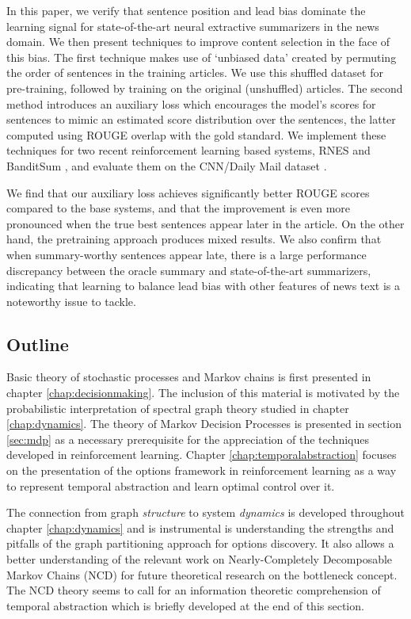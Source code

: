 In this paper, we verify that 
sentence position and lead bias dominate the 
learning signal for  state-of-the-art neural 
extractive summarizers in the news domain. 
We then present techniques to improve content selection in 
the face of this bias. 
The first technique makes use of `unbiased data' 
created by permuting the order of sentences in the training
articles. We use this shuffled dataset for pre-training, followed by 
training on the original (unshuffled) articles. 
The second method introduces an auxiliary loss 
which encourages the model's scores for sentences 
to mimic an estimated score distribution over the
sentences, the latter computed using ROUGE overlap 
with the gold standard. We implement these techniques 
for two recent reinforcement learning based systems, 
RNES \parencite{DBLP:conf/aaai/WuH18} and 
BanditSum \parencite{dong2018banditsum}, and evaluate 
them on the CNN/Daily Mail dataset \parencite{hermann2015teaching}.

We find that our auxiliary loss achieves 
significantly better ROUGE scores
compared to the base systems, and that the 
improvement is even more pronounced when the true 
best sentences appear later in the article. 
On the other hand, the pretraining approach produces mixed results.
We also confirm that when summary-worthy sentences 
appear late, there is a large performance discrepancy 
between the oracle summary and state-of-the-art summarizers,
indicating that learning to balance lead bias with 
other features of news text is a noteworthy issue to tackle.

\subsection{Outline}

Basic theory of stochastic processes and Markov chains is first presented in chapter \ref{chap:decisionmaking}. The inclusion of this material is motivated by the probabilistic interpretation of spectral graph theory studied in chapter \ref{chap:dynamics}. The theory of Markov Decision Processes is presented in section \ref{sec:mdp} as a necessary prerequisite for the appreciation of the techniques developed in reinforcement learning. Chapter \ref{chap:temporalabstraction} focuses on the presentation of the options framework \parencite{Sutton1999} in reinforcement learning as a way to represent temporal abstraction and learn optimal control over it.

The connection from graph \textit{structure} to system \textit{dynamics} is developed throughout chapter \ref{chap:dynamics} and is instrumental is understanding the strengths and pitfalls of the graph partitioning approach for options discovery. It also allows a better understanding of the relevant work on Nearly-Completely Decomposable Markov Chains (NCD) for future theoretical research on the bottleneck concept. The NCD theory seems to call for an information theoretic comprehension of temporal abstraction which is briefly developed at the end of this section.

